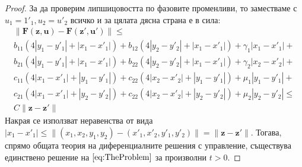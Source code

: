 \begin{proof}
  За да проверим липшицовостта по фазовите променливи, то заместваме с $u_1 = 1'_1, u_2 = u'_2$ всичко и за цялата дясна страна е в сила:
  \begin{multline}
    \|\mathbf{F}(\mathbf{z}, \mathbf{u}) - \mathbf{F}(\mathbf{z}', \mathbf{u}')\| \leq \\
    b_{11} (4 |y_1 - y'_1| + |x_1 - x'_1|) +
    b_{12} (4 |y_2 - y'_2| + |x_1 - x'_1|) + \gamma_1 |x_1-x'_1| + \\
    b_{21} (4 |y_1 - y'_1| + |x_1 - x'_1|) +
    b_{22} (4 |y_2 - y'_2| + |x_1 - x'_1|) + \gamma_2 |x_2-x'_2| + \\
    c_{11} (4 |x_1 - x'_1| + |y_1 - y'_1|) +
    c_{22} (4 |x_2 - x'_2| + |y_1 - y'_1|) + \mu_1 |y_1 - y'_1| + \\
    c_{21} (4 |x_1 - x'_1| + |y_2 - y'_2|) +
    c_{22} (4 |x_2 - x'_2| + |y_2 - y'_2|) + \mu_2 |y_2 - y'_2| \leq \\
    C \|\mathbf{z} - \mathbf{z}'\|
  \end{multline}
  Накрая се използват неравенства от вида $|x_1-x'_1| \leq \|(x_1, x_2, y_1, y_2) - (x'_1, x'_2, y'_1, y'_2)\| = \|\mathbf{z} - \mathbf{z}'\|$.
  Тогава, спрямо общата теория на диференциалните решения с управление, съществува единствено решение на $\eqref{eq:TheProblem}$ за произволни $t>0$.
  \end{proof}

